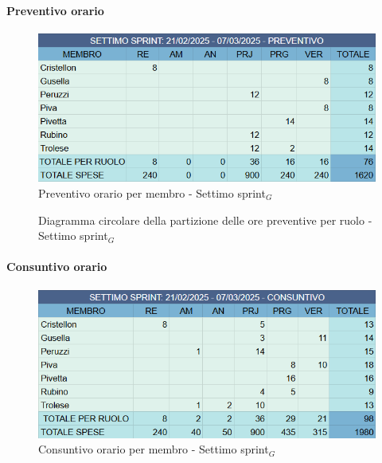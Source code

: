 \documentclass[10pt]{article}
\begin{document}
{{{{{{{{        \paragraph{Preventivo orario}\mbox{}\vspace{0.4em}
        \begin{figure}[H]
            \centering
            \includegraphics[width=0.6\linewidth]{preventivoOreSettimoSprint.png}
            \caption{Preventivo orario per membro - Settimo sprint$_G$}
            \label{fig:Preventivo orario per membro - Settimo sprint$_G$}
        \end{figure}

        \begin{figure}[H]
            \centering
            \caption{Diagramma circolare della partizione delle ore preventive per ruolo - Settimo sprint$_G$ }
            \label{fig:Diagramma circolare della partizione delle ore preventive per ruolo - Settimo sprint$_G$}
        \end{figure}
        
        \paragraph{Consuntivo orario}\mbox{}\vspace{0.4em}
        \begin{figure}[ht]
            \centering
            \includegraphics[width=0.6\linewidth]{consuntivoOreSettimoSprint.png}
            \caption{Consuntivo orario per membro - Settimo sprint$_G$}
            \label{fig:Consuntivo orario per membro - Settimo sprint$_G$}
        \end{figure}

}}}}}}}}
\end{document}
